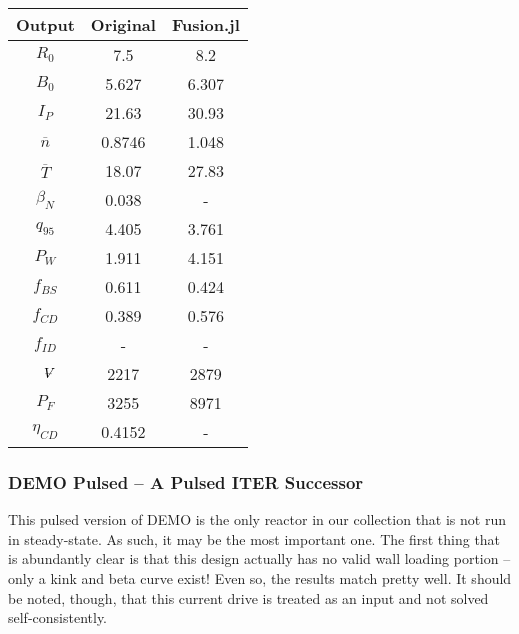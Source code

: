 \begin{table}[h!]
\begin{subtable}[t]{0.5\textwidth}
\begin{tabular}{ c|c|c }
Output           & Original         & Fusion.jl        \\  
\hline
$R_{0}$          & 7.5              & 8.2           \\
$B_{0}$          & 5.627            & 6.307           \\
$I_{P}$          & 21.63            & 30.93           \\
$\overline n$    & 0.8746           & 1.048           \\
$\overline T$    & 18.07            & 27.83           \\
$\beta_{N}$       & 0.038            & -           \\
$q_{95}$         & 4.405            & 3.761           \\
$P_{W}$          & 1.911            & 4.151           \\
$f_{BS}$         & 0.611            & 0.424          \\
$f_{CD}$         & 0.389            & 0.576          \\
$f_{ID}$         & -              & -             \\
$\volume$         & 2217           & 2879          \\
$P_{F}$          & 3255           & 8971          \\
$\eta_{CD}$      & 0.4152           & -          \\

\end{tabular}
\end{subtable}
\hfill
\hfill
\end{table}

\newpage 

\subsubsection{DEMO Pulsed -- A Pulsed ITER Successor}

This pulsed version of DEMO is the only reactor in our collection that is not run in steady-state. As such, it may be the most important one. The first thing that is abundantly clear is that this design actually has no valid wall loading portion -- only a kink and beta curve exist! Even so, the results match pretty well. It should be noted, though, that this current drive is treated as an input and not solved self-consistently.

